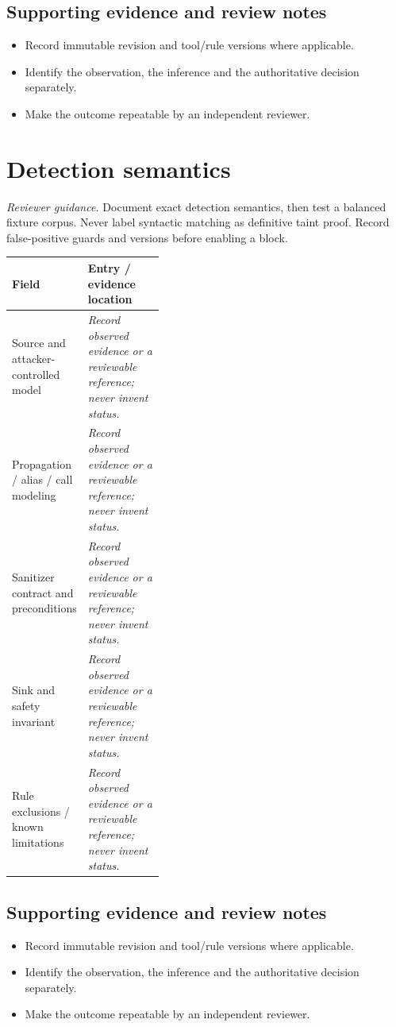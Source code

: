 \documentclass[10pt,letterpaper]{article}
\begin{document}
\subsection{Supporting evidence and review notes}
\begin{itemize}
\item Record immutable revision and tool/rule versions where applicable.
\item Identify the observation, the inference and the authoritative decision separately.
\item Make the outcome repeatable by an independent reviewer.
\end{itemize}
\clearpage
\section{Detection semantics}
\textit{Reviewer guidance.} Document exact detection semantics, then test a balanced fixture corpus. Never label syntactic matching as definitive taint proof. Record false-positive guards and versions before enabling a block.
\begin{tabularx}{\linewidth}{@{}p{0.38\linewidth}Y@{}}
\toprule Field & Entry / evidence location\\\midrule
Source and attacker-controlled model & \textit{Record observed evidence or a reviewable reference; never invent status.}\\[1.0em]
\midrule
Propagation / alias / call modeling & \textit{Record observed evidence or a reviewable reference; never invent status.}\\[1.0em]
\midrule
Sanitizer contract and preconditions & \textit{Record observed evidence or a reviewable reference; never invent status.}\\[1.0em]
\midrule
Sink and safety invariant & \textit{Record observed evidence or a reviewable reference; never invent status.}\\[1.0em]
\midrule
Rule exclusions / known limitations & \textit{Record observed evidence or a reviewable reference; never invent status.}\\[1.0em]
\midrule
\end{tabularx}
\subsection{Supporting evidence and review notes}
\begin{itemize}
\item Record immutable revision and tool/rule versions where applicable.
\item Identify the observation, the inference and the authoritative decision separately.
\item Make the outcome repeatable by an independent reviewer.
\end{itemize}
\clearpage
\end{document}
